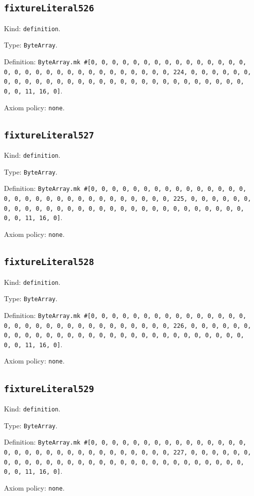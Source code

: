 \documentclass[11pt]{article}
\begin{document}
\subsection*{\texttt{fixtureLiteral526}}
\noindent Kind: \texttt{definition}.\par
\noindent Type: \texttt{ByteArray}.\par
\noindent Definition: \texttt{ByteArray.mk \#[0, 0, 0, 0, 0, 0, 0, 0, 0, 0, 0, 0, 0, 0, 0, 0, 0, 0, 0, 0, 0, 0, 0, 0, 0, 0, 0, 0, 0, 0, 0, 224, 0, 0, 0, 0, 0, 0, 0, 0, 0, 0, 0, 0, 0, 0, 0, 0, 0, 0, 0, 0, 0, 0, 0, 0, 0, 0, 0, 0, 0, 0, 0, 11, 16, 0]}.\par
\noindent Axiom policy: \texttt{none}.\par
\subsection*{\texttt{fixtureLiteral527}}
\noindent Kind: \texttt{definition}.\par
\noindent Type: \texttt{ByteArray}.\par
\noindent Definition: \texttt{ByteArray.mk \#[0, 0, 0, 0, 0, 0, 0, 0, 0, 0, 0, 0, 0, 0, 0, 0, 0, 0, 0, 0, 0, 0, 0, 0, 0, 0, 0, 0, 0, 0, 0, 225, 0, 0, 0, 0, 0, 0, 0, 0, 0, 0, 0, 0, 0, 0, 0, 0, 0, 0, 0, 0, 0, 0, 0, 0, 0, 0, 0, 0, 0, 0, 0, 11, 16, 0]}.\par
\noindent Axiom policy: \texttt{none}.\par
\subsection*{\texttt{fixtureLiteral528}}
\noindent Kind: \texttt{definition}.\par
\noindent Type: \texttt{ByteArray}.\par
\noindent Definition: \texttt{ByteArray.mk \#[0, 0, 0, 0, 0, 0, 0, 0, 0, 0, 0, 0, 0, 0, 0, 0, 0, 0, 0, 0, 0, 0, 0, 0, 0, 0, 0, 0, 0, 0, 0, 226, 0, 0, 0, 0, 0, 0, 0, 0, 0, 0, 0, 0, 0, 0, 0, 0, 0, 0, 0, 0, 0, 0, 0, 0, 0, 0, 0, 0, 0, 0, 0, 11, 16, 0]}.\par
\noindent Axiom policy: \texttt{none}.\par
\subsection*{\texttt{fixtureLiteral529}}
\noindent Kind: \texttt{definition}.\par
\noindent Type: \texttt{ByteArray}.\par
\noindent Definition: \texttt{ByteArray.mk \#[0, 0, 0, 0, 0, 0, 0, 0, 0, 0, 0, 0, 0, 0, 0, 0, 0, 0, 0, 0, 0, 0, 0, 0, 0, 0, 0, 0, 0, 0, 0, 227, 0, 0, 0, 0, 0, 0, 0, 0, 0, 0, 0, 0, 0, 0, 0, 0, 0, 0, 0, 0, 0, 0, 0, 0, 0, 0, 0, 0, 0, 0, 0, 11, 16, 0]}.\par
\noindent Axiom policy: \texttt{none}.\par
\end{document}
